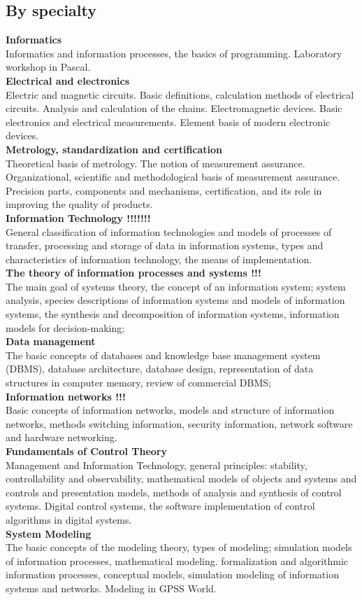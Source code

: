 \documentclass[a4paper, 12pt]{article}
\newcommand{\group}[1] {\subsection{#1}}
\newcommand{\discipline}[1] {\textbf{#1} \\ }
\newcommand{\desc}[1] { #1 \\ }
\begin{document}
\group{By specialty}

\discipline{Informatics}
\desc{Informatics and information processes, the basics of programming. Laboratory workshop in Pascal.}

\discipline{Electrical and electronics}
\desc{Electric and magnetic circuits. Basic definitions, calculation methods of electrical circuits. Analysis and calculation of the chains. Electromagnetic devices. Basic electronics and electrical measurements. Element basis of modern electronic devices.}

\discipline{Metrology, standardization and certification}
\desc{Theoretical basis of metrology. The notion of measurement assurance. Organizational, scientific and methodological basis of measurement assurance. Precision parts, components and mechanisms, certification, and its role in improving the quality of products.}

\discipline{Information Technology !!!!!!!}
\desc{General classification of information technologies and models of processes of transfer, processing and storage of data in information systems, types and characteristics of information technology, the means of implementation.}

\discipline{The theory of information processes and systems !!!}
\desc{The main goal of systems theory, the concept of an information system; system analysis, species descriptions of information systems and models of information systems, the synthesis and decomposition of information systems, information models for decision-making;}

\discipline{Data management}
\desc{The basic concepts of databases and knowledge base management system (DBMS), database architecture, database design, representation of data structures in computer memory, review of commercial DBMS;}

\discipline{Information networks !!!}
\desc{Basic concepts of information networks, models and structure of information networks, methods switching information, security information, network software and hardware networking.}

\discipline{Fundamentals of Control Theory}
\desc{Management and Information Technology, general principles: stability, controllability and observability, mathematical models of objects and systems and controls and presentation models, methods of analysis and synthesis of control systems. Digital control systems, the software implementation of control algorithms in digital systems.}

\discipline{System Modeling}
\desc{The basic concepts of the modeling theory, types of modeling; simulation models of information processes, mathematical modeling. formalization and algorithmic information processes, conceptual models, simulation modeling of information systems and networks. Modeling in GPSS World.}
\end{document}
